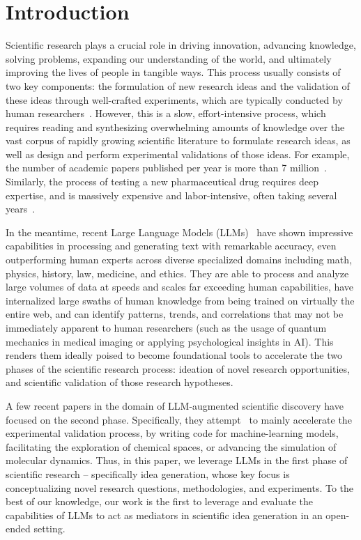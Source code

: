 \section{Introduction}

Scientific research plays a crucial role in driving innovation, advancing knowledge, solving problems, expanding our understanding of the world, and ultimately improving the lives of people in tangible ways. This process usually consists of two key components: the formulation of new research ideas and the validation of these ideas through well-crafted experiments, which are typically conducted by human researchers~\cite{scientificdiscovery/1, scientificdiscovery/2, Airesearchagent}. However, this is a slow, effort-intensive process, which requires reading and synthesizing overwhelming amounts of knowledge over the vast corpus of rapidly growing scientific literature to formulate research ideas, as well as design and perform experimental validations of those ideas. For example, the number of academic papers published per year is more than 7 million~\cite {paper}. Similarly, the process of testing a new pharmaceutical drug requires deep expertise, and is massively expensive and labor-intensive, often taking several years~\cite{drugdiscovery}.



In the meantime, recent Large Language Models (LLMs)~\cite{Llama2, GPT-4, Gemini} have shown impressive capabilities in processing and generating text with remarkable accuracy, even outperforming human experts across diverse specialized domains including math, physics, history, law, medicine, and ethics. They are able to process and analyze large volumes of data at speeds and scales far exceeding human capabilities, have internalized large swaths of human knowledge from being trained on virtually the entire web, and can identify patterns, trends, and correlations that may not be immediately apparent to human researchers (such as the usage of quantum mechanics in medical imaging or applying psychological insights in AI). This renders them ideally poised to become foundational tools to accelerate the two phases of the scientific research process: ideation of novel research opportunities, and scientific validation of those research hypotheses.

A few recent papers in the domain of LLM-augmented scientific discovery have focused on the second phase. Specifically, they attempt~\cite{Airesearchagent, LLM/discovery/1, LLM/discovery/2} to mainly accelerate the experimental validation process, by writing code for machine-learning models, facilitating the exploration of chemical spaces, or advancing the simulation of molecular dynamics.
Thus, in this paper, we leverage LLMs in the first phase of scientific research -- specifically idea generation, whose key focus is conceptualizing novel research questions, methodologies, and experiments. To the best of our knowledge, our work is the first to leverage and evaluate the capabilities of LLMs to act as mediators in scientific idea generation in an open-ended setting.

